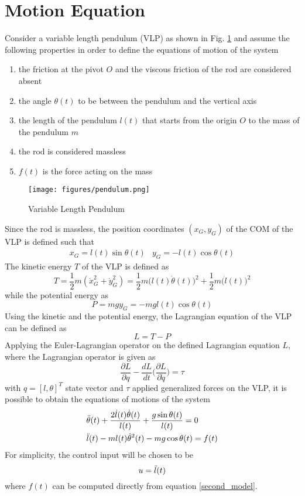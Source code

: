 \documentclass[main.tex]{subfiles}
\begin{document}
\section{Motion Equation}
\label{sec:motion-equation}
Consider a variable length pendulum (VLP) as shown in Fig. \ref{vlp} and assume the following properties in order to define the equations of motion of the system

\begin{enumerate}
    \item the friction at the pivot $O$ and the viscous friction of the rod are considered absent
    \item the angle $\theta(t)$ to be between the pendulum and the vertical axis
    \item the length of the pendulum $l(t)$ that starts from the origin $O$ to the mass of the pendulum $m$
    \item the rod is considered massless
    \item  $f(t)$ is the force acting on the mass
\end{enumerate}
\begin{figure}[H]
    \centering
    \texttt{[image: figures/pendulum.png]}
    \caption{Variable Length Pendulum \cite{xin2014control}}
    \label{vlp}
\end{figure}
Since the rod is massless, the position coordinates $(x_G,y_G)$
of the COM of the VLP is defined such that
\begin{eqnarray}
x_G = l(t)\sin\theta(t) &  y_G = -l(t)\cos\theta(t) 
\end{eqnarray}
The kinetic energy $T$ of the VLP is defined as
\begin{equation}
    T = \frac{1}{2}m(\dot{x}_G^2+\dot{y}_G^2) = \frac{1}{2}m\big(l(t)\dot{\theta}(t)\big)^2+\frac{1}{2}m\big(\dot{l}(t)\big)^2 
\end{equation}
while the potential energy as
\begin{equation}
    P = mgy_G = -mgl(t)\cos\theta(t)  
\end{equation}
Using the kinetic and the potential energy, the Lagrangian equation of the VLP can be defined as
\begin{equation*}
    L = T-P
\end{equation*}
Applying the Euler-Lagrangian operator on the defined Lagrangian equation $L$, where the Lagrangian operator is given as
\begin{equation}\label{model}
\frac{\partial L}{\partial q}   -\frac{dL}{dt}\Bigg(\frac{\partial L}{\partial \dot{q}}\Bigg) = \tau
\end{equation}
with $q = [l, \theta]^T$ state vector and $\tau$ applied generalized forces on the VLP, it is possible to obtain the
equations of motions of the system
\begin{align} \label{full_model}
&\Ddot{\theta}(t)+\frac{2\dot{l}(t)\dot{\theta}(t)}{l(t)} + \frac{g\sin\theta(t)}{l(t)} = 0  \\
\label{second_model}
&\Ddot{l}(t)-ml(t)\dot{\theta}^2(t)-mg\cos\theta(t) = f(t)
\end{align}
For simplicity, the control input will be chosen to be $$u =\Ddot{l}(t)$$
where $f(t)$ can be computed directly from equation \eqref{second_model}.
\end{document}
